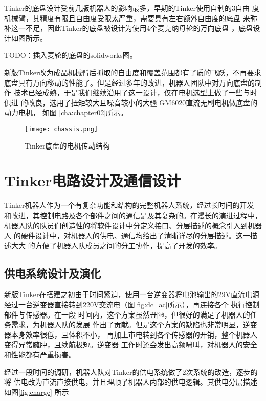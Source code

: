 Tinker的底盘设计受前几版机器人的影响最多，早期的Tinker使用自制的3自由
度机械臂，其精度有限且自由度受限太严重，需要具有左右额外自由度的底盘
来弥补这一不足，因此Tinker的底盘被设计为使用4个麦克纳母轮的万向底盘
\cite{tlale2008kinematics}，底盘设计如图所示。

TODO：插入麦轮的底盘的solidworks图。

新版Tinker改为成品机械臂后抓取的自由度和覆盖范围都有了质的飞跃，不再要求
底盘具有万向移动的性能了。但是经过多年的改进，机器人团队中对万向底盘的制作
技术已经成熟，于是我们继续沿用了这一设计，仅在电机选型上做了一些与时俱进
的改良，选用了扭矩较大且噪音较小的大疆 GM6020直流无刷电机做底盘的动力电机，
如图 \ref{cha:chapter02}所示。

\begin{figure}[ht] %
  \centering
  \texttt{[image: chassis.png]}
  \caption{Tinker底盘的电机传动结构}
  \label{fig:ur5_2f140}
\end{figure}


\section{Tinker电路设计及通信设计}

Tinker机器人作为一个有复杂功能和结构的完整机器人系统，经过长时间的开发
和改进，其控制电路及各个部件之间的通信是及其复杂的。在漫长的演进过程中，
机器人队的队员们创造性的将软件设计中分定义接口、分层描述的概念引入到机器人
的硬件设计中，对机器人的供电、通信均给出了清晰详尽的分层描述。这一描述大大
的方便了机器人队成员之间的分工协作，提高了开发的效率。

\subsection{供电系统设计及演化}

新版Tinker在搭建之初由于时间紧迫，使用一台逆变器将电池输出的29V直流电源
经过一台逆变器直接转到220V交流电（图\ref{fig:dc_ac}所示），再连接各个
执行控制部件与传感器。在一段
时间内，这个方案虽然丑陋，但很好的满足了机器人的任务需求，为机器人队的发展
作出了贡献。但是这个方案的缺陷也非常明显，逆变器本身效率很低，且体积不小，
再加上市电转到各个传感器的开销，整个机器人变得异常臃肿，且续航极短。逆变器
工作时还会发出高频啸叫，对机器人的安全和性能都有严重损害。

经过一段时间的调研，机器人队对Tinker的供电系统做了2次系统的改造，逐步的将
供电改为直流直接供电，并且理顺了机器人内部的供电逻辑。其供电分层描述如图\ref{fig:charge}
所示

